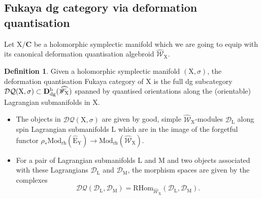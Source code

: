 \documentclass{article}
\theoremstyle{plain}
\theoremstyle{definition}
\newtheorem{definition}[theorem]{Definition}
\theoremstyle{remark}
\newcommand{\Db}{{\mathrm{\bf{D}}}^{\mr{b}}}
\newcommand{\mr}{\mathrm}
\newcommand{\C}{\mathbf C}
\newcommand{\3}{\vspace{3mm}}
\newcommand{\2}{\vspace{2mm}}
\newcommand{\1}{\vspace{1mm}}
\begin{document}
\subsection{Fukaya dg category via deformation quantisation}
Let $\mr{X}/\C$ be a holomorphic symplectic manifold which we are going to equip with its canonical deformation quantisation algebroid $\widehat{\mathscr{W}}_\mr{X}$. 
\2
 \begin{definition}
Given a holomorphic symplectic manifold $(\mr{X},\sigma)$, the deformation quantisation Fukaya category of $\mr{X}$ is the full dg subcategory $\mathcal{DQ}(\mr{X},\sigma)\subset\Db_\mr{dg}(\widehat{\mathscr{W}}_\mr{X})$ spanned by quantised orientations along the (orientable) Lagrangian submanifolds in $\mr{X}$.
\end{definition}
\2
\begin{itemize}
\item The objects in $\mathcal{DQ}(\mr{X},\sigma)$ are given by good, simple $\widehat{\mathscr{W}}_\mr{X}$-modules $\mathscr{D}_\mr{L}$ along spin Lagrangian submanifolds $\mr{L}$ which are in the image of the forgetful functor $\rho_*\mr{Mod}_\mr{rh}(\widehat{\mr{E}}_\mr{Y})\to \mr{Mod}_\mr{rh}(\widehat{\mathscr{W}}_\mr{X})$.
\item For a pair of Lagrangian submanifolds $\mr{L}$ and $\mr{M}$ and two objects associated with these Lagrangians $\mathscr{D}_\mr{L}$ and $\mathscr{D}_\mr{M}$, the morphism spaces are given by the complexes $$\mathcal{DQ}\left(\mathscr{D}_\mr{L},\mathscr{D}_\mr{M}\right)=\mr{RHom}_{\widehat{\mathscr{W}}_\mr{X}}\left(\mathscr{D}_\mr{L},\mathscr{D}_\mr{M}\right).$$
\end{itemize}
\end{document}
